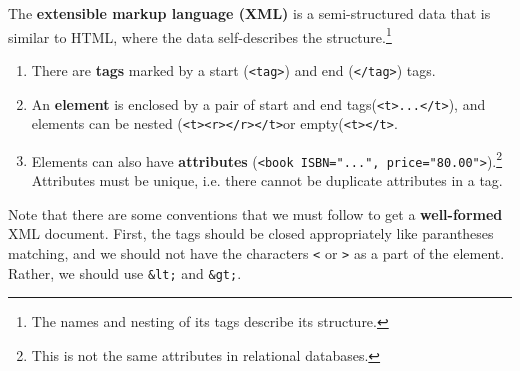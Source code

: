 \documentclass{article}
\begin{document}
  \begin{definition}[XML]
    The \textbf{extensible markup language (XML)} is a semi-structured data that is similar to HTML, where the data self-describes the structure.\footnote{The names and nesting of its tags describe its structure.} 
    \begin{enumerate}
      \item There are \textbf{tags} marked by a start (\texttt{<tag>}) and end (\texttt{</tag>}) tags. 
      \item An \textbf{element} is enclosed by a pair of start and end tags(\texttt{<t>...</t>}), and elements can be nested (\texttt{<t><r></r></t>}or empty(\texttt{<t></t>}.  
      \item Elements can also have \textbf{attributes} (\texttt{<book ISBN="...", price="80.00">}).\footnote{This is not the same attributes in relational databases.} Attributes must be unique, i.e. there cannot be duplicate attributes in a tag. 
    \end{enumerate}
    Note that there are some conventions that we must follow to get a \textbf{well-formed} XML document. First, the tags should be closed appropriately like parantheses matching, and we should not have the characters \texttt{<} or \texttt{>} as a part of the element. Rather, we should use \texttt{\&lt;} and \texttt{\&gt;}. 
  \end{definition}
\end{document}
